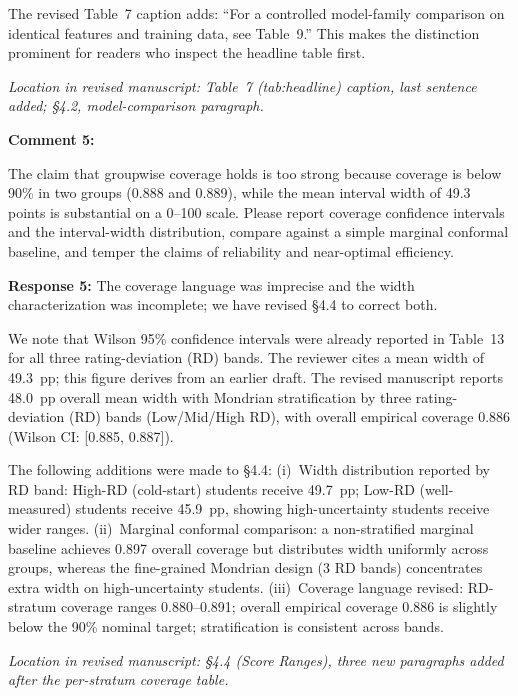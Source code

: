 \documentclass[11pt]{article}
\newcommand{\rev}[1]{{\color{ccolor}#1}}
\begin{document}
\rev{The revised Table~7 caption adds: ``For a controlled model-family comparison on
identical features and training data, see Table~9.''} This makes the distinction
prominent for readers who inspect the headline table first.

\textit{Location in revised manuscript: Table~7 (tab:headline) caption, last sentence
added; \S4.2, model-comparison paragraph.}

\bigskip

\textbf{Comment 5:}
\begin{rquote}
The claim that groupwise coverage holds is too strong because coverage is below 90\%
in two groups (0.888 and 0.889), while the mean interval width of 49.3 points is
substantial on a 0--100 scale. Please report coverage confidence intervals and the
interval-width distribution, compare against a simple marginal conformal baseline, and
temper the claims of reliability and near-optimal efficiency.
\end{rquote}

\textbf{Response 5:}
The coverage language was imprecise and the width characterization was incomplete;
we have revised \S4.4 to correct both.

We note that Wilson 95\% confidence intervals were already reported in Table~13
for all three rating-deviation (RD) bands. The reviewer cites a mean width of 49.3~pp; this figure derives from an earlier draft.
The revised manuscript reports 48.0~pp overall mean width with Mondrian stratification
by three rating-deviation (RD) bands (Low/Mid/High RD), with overall empirical coverage
0.886 (Wilson CI: [0.885, 0.887]).

\rev{The following additions were made to \S4.4:
(i)~Width distribution reported by RD band: High-RD (cold-start) students receive
49.7~pp; Low-RD (well-measured) students receive 45.9~pp, showing high-uncertainty
students receive wider ranges.
(ii)~Marginal conformal comparison: a non-stratified marginal baseline achieves
0.897 overall coverage but distributes width uniformly across groups, whereas the
fine-grained Mondrian design (3 RD bands) concentrates extra width on high-uncertainty
students.
(iii)~Coverage language revised: RD-stratum coverage ranges 0.880--0.891; overall
empirical coverage 0.886 is slightly below the 90\% nominal target; stratification
is consistent across bands.}

\textit{Location in revised manuscript: \S4.4 (Score Ranges), three new paragraphs
added after the per-stratum coverage table.}
\end{document}
